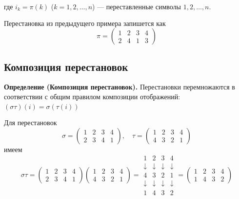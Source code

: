 \documentclass[a4paper,12pt]{article}
\theoremstyle{definition}
\theoremstyle{plain}
\theoremstyle{remark}
\begin{document}
	где $i_k = \pi(k)$ ($k = 1, 2, \dots, n$) — переставленные символы $1, 2, \dots, n$.
	
	\begin{tcolorbox}[colback=gray!5, colframe=gray!50, title=Пример]
		Перестановка из предыдущего примера запишется как
		\[
		\pi = \begin{pmatrix}
			1 & 2 & 3 & 4 \\
			2 & 4 & 1 & 3
		\end{pmatrix}
		\]
	\end{tcolorbox}
	
	\subsection{Композиция перестановок}
	
	\noindent \textbf{Определение (Композиция перестановок).}
	Перестановки перемножаются в соответствии с общим правилом композиции отображений: $(\sigma \tau)(i) = \sigma(\tau(i))$
	
	
	
	\begin{tcolorbox}[colback=gray!5, colframe=gray!50, title={Пример умножения перестановок}]
	Для перестановок
	\[
	\sigma = \begin{pmatrix}
	1 & 2 & 3 & 4 \\
	2 & 3 & 4 & 1
	\end{pmatrix}, \quad
	\tau = \begin{pmatrix}
	1 & 2 & 3 & 4 \\
	4 & 3 & 2 & 1
	\end{pmatrix}
	\]
	имеем
	\[
	\sigma \tau = \begin{pmatrix}
	1 & 2 & 3 & 4 \\
	2 & 3 & 4 & 1
	\end{pmatrix}
	\begin{pmatrix}
	1 & 2 & 3 & 4 \\
	4 & 3 & 2 & 1
	\end{pmatrix} =
	\begin{array}{cccc}
	1 & 2 & 3 & 4 \\
	\downarrow & \downarrow & \downarrow & \downarrow \\
	4 & 3 & 2 & 1 \\
	\downarrow & \downarrow & \downarrow & \downarrow \\
	1 & 4 & 3 & 2
	\end{array} = \begin{pmatrix}
	1 & 2 & 3 & 4 \\
	1 & 4 & 3 & 2
	\end{pmatrix}
	\]
	\end{tcolorbox}
	
\end{document}
